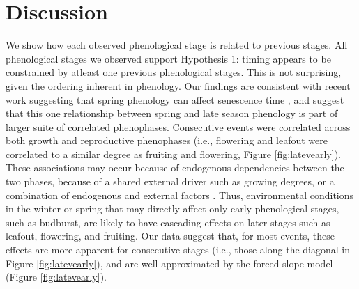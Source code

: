 \documentclass{article}
\begin{document}
\section* {Discussion}
\par We show how each observed phenological stage is related to previous stages. All phenological stages we observed support Hypothesis 1: timing appears to be constrained by atleast one previous phenological stages.  This is not surprising, given the ordering inherent in phenology. Our findings are consistent with recent work suggesting that spring phenology can affect senescence time \citep{keenan2015,liu2016}, and suggest that this one relationship between spring and late season phenology is part of larger suite of correlated phenophases. Consecutive events were correlated across both growth and reproductive phenophases (i.e., flowering and leafout were correlated to a similar degree as fruiting and flowering, Figure \ref{fig:latevearly}). These associations may occur because of endogenous dependencies between the two phases, because of a shared external driver such as growing degrees, or a combination of endogenous and external factors \citep{lechowicz1995}. Thus, environmental conditions in the winter or spring that may directly affect only early phenological stages, such as budburst, are likely to have cascading effects on later stages such as leafout, flowering, and fruiting. Our data suggest that, for most events, these effects are more apparent for consecutive stages (i.e., those along the diagonal in Figure \ref{fig:latevearly}), and are well-approximated by the forced slope model (Figure \ref{fig:latevearly}). %
\end{document}
